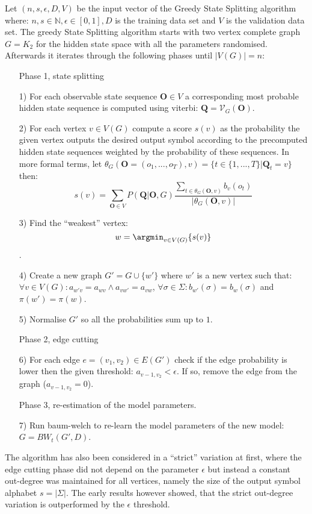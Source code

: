 Let $(n, s, \epsilon, D, V)$ be the input vector of the Greedy State Splitting algorithm where: $n, s \in \mathbb{N}, \epsilon\in[0,1], D$ is the training data set and $V$ is the validation data set. The greedy State Splitting algorithm starts with two vertex complete graph $G=K_2$ for the hidden state space with all the parameters randomised. Afterwards it iterates through the following phases until $|V(G)| = n$:

\begin{itemize}
	\item[] Phase 1, state splitting
	\item[1)] For each observable state sequence $\mathbf{O} \in V$ a corresponding most probable hidden state sequence is computed using \gls{viterbi}: $\mathbf{Q}=\mathcal{V}_G(\mathbf{O})$.
	\item[2)] For each vertex $v \in V(G)$ compute a score $s(v)$ as the probability the given vertex outputs the desired output symbol according to the precomputed hidden state sequences weighted by the probability of these sequences. In more formal terms, let $\theta_G(\mathbf{O}=(o_1,...,o_T), v) = \{t\in\{1, ..., T\}|\mathbf{Q}_t=v\}$ then: $$s(v) = \sum_{\mathbf{O}\in V}P(\mathbf{Q}|\mathbf{O},G) \frac{\sum_{t \in \theta_G(\mathbf{O}, v)}b_v(o_t)}{|\theta_G(\mathbf{O}, v)|}$$
	\item[3)] Find the ``weakest'' vertex: $$w = \argmin_{v\in V(G)}\{s(v)\}$$.
	\item[4)] Create a new graph $G' = G\cup \{w'\}$ where $w'$ is a new vertex such that: $\forall v\in V(G): a_{w'v} = a_{wv} \land a_{vw'} = a_{vw}$, $\forall \sigma \in \Sigma: b_{w'}(\sigma) = b_w(\sigma)$ and $\pi(w') = \pi(w)$.
	\item[5)] Normalise $G'$ so all the probabilities sum up to $1$.
	\item[] Phase 2, edge cutting
	\item[6)] For each edge $e = (v_1,v_2)\in E(G')$ check if the edge probability is lower then the given threshold: $a_{v-1,v_2}<\epsilon$. If so, remove the edge from the graph ($a_{v-1,v_2} = 0$).
	\item[] Phase 3, re-estimation of the model parameters.
	\item[7)] Run \gls{baum-welch} to re-learn the model parameters of the new model: $G = BW_t(G', D)$.
\end{itemize}

The algorithm has also been considered in a ``strict'' variation at first, where the edge cutting phase did not depend on the parameter $\epsilon$ but instead a constant out-degree was maintained for all vertices, namely the size of the output symbol alphabet $s = |\Sigma|$. The early results however showed, that the strict out-degree variation is outperformed by the $\epsilon$ threshold.